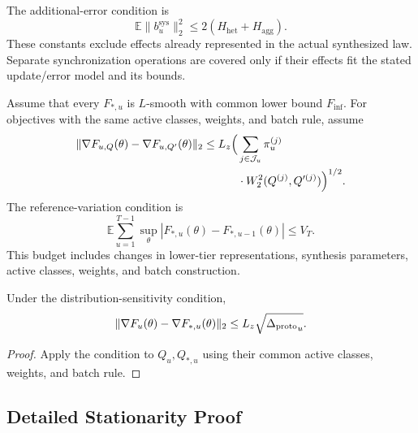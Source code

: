 The additional-error condition is
\begin{equation}
 \mathbb E\|b_u^{\mathrm{sys}}\|_2^2
 \le2(H_{\mathrm{het}}+H_{\mathrm{agg}}).
\end{equation}
These constants exclude effects already represented in the actual synthesized law. Separate synchronization operations are covered only if their effects fit the stated update/error model and its bounds.

Assume that every $F_{*,u}$ is $L$-smooth with common lower bound $F_{\inf}$. For objectives with the same active classes, weights, and batch rule, assume
\begin{equation}
\begin{split}
 \|\nabla F_{u,Q}(\theta)-\nabla F_{u,Q'}(\theta)\|_2
 \le L_z\Bigl(&\sum_{j\in\mathcal J_u}\pi_u^{(j)}\\
 &\cdot W_2^2(Q^{(j)},Q'^{(j)})\Bigr)^{1/2}.
\end{split}
\end{equation}
The reference-variation condition is
\begin{equation}
 \mathbb E\sum_{u=1}^{T-1}\sup_\theta
 |F_{*,u}(\theta)-F_{*,u-1}(\theta)|\le V_T.
 \label{eq:supp_reference_variation}
\end{equation}
This budget includes changes in lower-tier representations, synthesis parameters, active classes, weights, and batch construction.

\begin{lemma}
\label{lem:synthesis_bias}
Under the distribution-sensitivity condition,
\begin{equation}
 \|\nabla F_u(\theta)-\nabla F_{*,u}(\theta)\|_2
 \le L_z\sqrt{{\Delta_{\mathrm{proto}}}_u}.
\end{equation}
\end{lemma}
\begin{proof}
Apply the condition to $Q_u,Q_{*,u}$ using their common active classes, weights, and batch rule.
\end{proof}

\subsection{Detailed Stationarity Proof}

